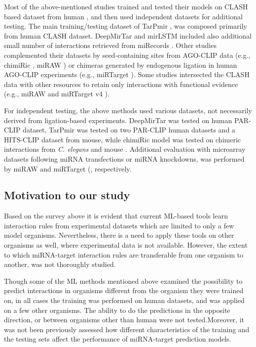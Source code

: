 \documentclass{bmcart}
\begin{document}
Most of the above-mentioned studies trained and tested their models on CLASH based dataset from human \cite{helwak2013mapping}, and then used independent datasets for additional testing. The main training/testing dataset of TarPmir \cite{ding2016tarpmir}, was composed primarily from human CLASH dataset. DeepMirTar \cite{wen2018deepmirtar} and mirLSTM \cite{paker2019mirlstm} included also additional small number of interactions retrieved from miRecords \cite{xiao2009mirecords}. Other studies complemented their datasets by seed-containing sites from AGO-CLIP data (e.g., chimiRic \cite{lu2016learning}, miRAW \cite{pla2018miraw}) or chimeras generated by endogenous ligation in human AGO-CLIP experiments (e.g., miRTarget \cite{wang2016improving}). Some studies intersected the CLASH data with other resources to retain only interactions with functional evidence (e.g., miRAW \cite{pla2018miraw} and  miRTarget v4 \cite{liu2019prediction}).

For independent testing, the above methods used various datasets, not necessarily derived from ligation-based experiments. 
DeepMirTar \cite{wen2018deepmirtar} was tested on human PAR-CLIP dataset, TarPmir \cite{ding2016tarpmir} was tested on two PAR-CLIP human datasets and a HITS-CLIP dataset from mouse, while chimiRic \cite{lu2016learning} model was tested on chimeric interactions from  \textit{C. elegans} \cite{grosswendt2014unambiguous} and mouse \cite{darnell_moore2015mirna}. Additional evaluation with microarray datasets following miRNA transfections or miRNA knockdowns, was performed by miRAW \cite{pla2018miraw}  and miRTarget (\cite{wang2016improving,liu2019prediction}, respectively. 

\subsection*{Motivation to our study}
Based on the survey above it is evident that current ML-based tools learn interaction rules from experimental datasets which are limited to only a few model organisms. Nevertheless, there is a need to apply these tools on other organisms as well, where experimental data is not available.
However, the extent to which miRNA-target interaction rules are transferable from one organism to another, was not thoroughly studied.

Though some of the ML methods mentioned above examined the possibility to predict interactions in organisms different from the organism they were trained on, in all cases the training was performed on human datasets, and was applied on a few other organisms. The ability to do the predictions in the opposite direction, or between organisms other than human were not tested.Moreover, it was not been previously assessed how different characteristics of the training and the testing sets affect the performance of miRNA-target prediction models.  
\end{document}
